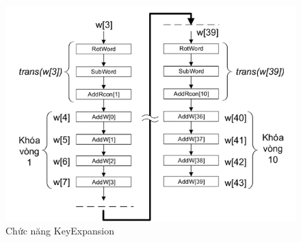 \begin{itemize}
\begin{figure}[H]
        \includegraphics{Ảnh/hiền/keyexpan.png}
        \caption{Chức năng KeyExpansion}
        

\end{figure}
\end{itemize}
